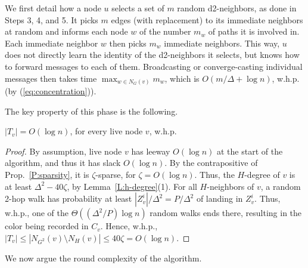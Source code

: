 We first detail how a node $u$ selects a set of $m$ random d2-neighbors, as done in Steps 3, 4, and 5. It picks $m$ edges (with replacement) to its immediate neighbors at random and informs each node $w$ of the number $m_w$ of paths it is involved in. Each immediate neighbor $w$ then picks $m_w$ immediate neighbors. This way, $u$ does not directly learn the identity of the d2-neighbors it selects, but knows how to forward messages to each of them. Broadcasting or converge-casting individual messages then takes time $\max_{w \in N_G(v)} m_w$, which is $O(m/\Delta + \log n)$, w.h.p. (by (\ref{eq:concentration})).

The key property of this phase is the following.

\begin{lemma}
$|T_v| = O(\log n)$, for every live node $v$, w.h.p.
\label{l:last}
\end{lemma}

\begin{proof}
By assumption, live node $v$ has leeway $O(\log n)$ at the start of the algorithm, and thus it has slack $O(\log n)$. 
By the contrapositive of Prop.~\ref{P:sparsity}, it is $\zeta$-sparse, for $\zeta=O(\log n)$. 
Thus, the $H$-degree of $v$ is at least $\Delta^2 - 40\zeta$, by Lemma~\ref{L:h-degree}(1). For all $H$-neighbors of $v$, a random 2-hop walk has probability at least $|Z_v^i|/\Delta^2 = P/\Delta^2$ of landing in $Z_v^i$. 
Thus, w.h.p., one of the $\Theta((\Delta^2/P)\log n)$ random walks ends there, resulting in the color being recorded in $C_v$. 
Hence, w.h.p., $|T_v| \le |N_{G^2}(v)\setminus N_H(v)| \le 40\zeta = O(\log n)$.
\end{proof}

We now argue the round complexity of the algorithm.

